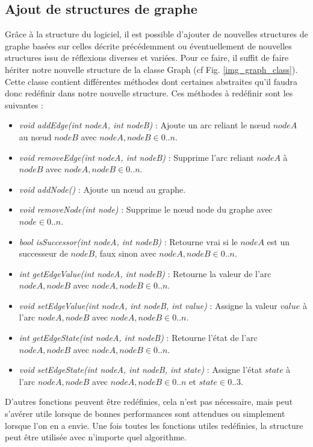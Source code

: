 \documentclass[11pt,a4paper]{article}
\begin{document}
		\subsection{Ajout de structures de graphe}
			Grâce à la structure du logiciel, il est possible d'ajouter de nouvelles structures de graphe basées sur celles décrite précédemment ou éventuellement de nouvelles structures issu de réflexions diverses et variées. Pour ce faire, il suffit de faire hériter notre nouvelle structure de la classe Graph (cf Fig. \ref{img_graph_class}). Cette classe contient différentes méthodes dont certaines abstraites qu'il faudra donc redéfinir dans notre nouvelle structure. Ces méthodes à redéfinir sont les suivantes : 
			\begin{itemize}
				\item \textit{void addEdge(int nodeA, int nodeB)} : Ajoute un arc reliant le n\oe ud $nodeA$ au n\oe ud $nodeB$ avec $nodeA, nodeB \in 0..n$.
				\item \textit{void removeEdge(int nodeA, int nodeB)} : Supprime l'arc reliant $nodeA$ à $nodeB$ avec $nodeA, nodeB \in 0..n$.
				\item \textit{void addNode()} : Ajoute un n\oe ud au graphe.
				\item \textit{void removeNode(int node)} : Supprime le n\oe ud node du graphe avec $node \in 0..n$.
				\item \textit{bool isSuccessor(int nodeA, int nodeB)} : Retourne vrai si le $nodeA$ est un successeur de $nodeB$, faux sinon avec $nodeA, nodeB \in 0..n$.
				\item \textit{int getEdgeValue(int nodeA, int nodeB)} : Retourne la valeur de l'arc $nodeA, nodeB$ avec $nodeA, nodeB \in 0..n$.
				\item \textit{void setEdgeValue(int nodeA, int nodeB, int value)} : Assigne la valeur $value$ à l'arc $nodeA, nodeB$ avec $nodeA, nodeB \in 0..n$.
				\item \textit{int getEdgeState(int nodeA, int nodeB)} : Retourne l'état de l'arc $nodeA, nodeB$ avec $nodeA, nodeB \in 0..n$.
				\item \textit{void setEdgeState(int nodeA, int nodeB, int state)} : Assigne l'état $state$ à l'arc $nodeA, nodeB$ avec $nodeA, nodeB \in 0..n$ et $state \in 0..3$.
			\end{itemize}
			\vspace*{.5cm}
			\indent\indent D'autres fonctions peuvent être redéfinies, cela n'est pas nécessaire, mais peut s'avérer utile lorsque de bonnes performances sont attendues ou simplement lorsque l'on en a envie. Une fois toutes les fonctions utiles redéfinies, la structure peut être utilisée avec n'importe quel algorithme.
			
\end{document}
